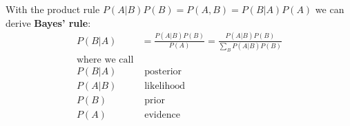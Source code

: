 With the product rule $P(A|B)P(B) = P(A, B) = P(B|A)P(A)$ we can derive \textbf{Bayes' rule}:
\begin{align*}
P(B|A) &= \frac{P(A|B)P(B)}{P(A)} = \frac{P(A|B)P(B)}{\sum\limits_B P(A|B)P(B)} \\
\mbox{where we call}   & \\
P(B|A)  &\mbox{ posterior} \\
P(A|B)  &\mbox{ likelihood} \\
P(B)    &\mbox{ prior} \\
P(A)    &\mbox{ evidence}
\end{align*}




